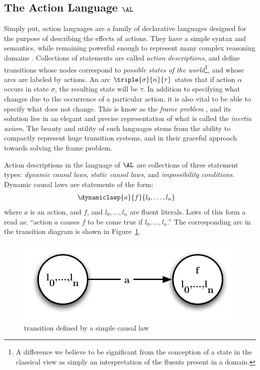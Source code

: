 \subsection{The Action Language $\AL$}

Simply put, action languages are a family of declarative languages designed for the purpose of describing the effects of actions. They have a simple syntax and semantics, while remaining powerful enough to represent many complex reasoning domains \cite{Bald2005}. Collections of statements are called \emph{action descriptions}, and define transitions whose nodes correspond to \emph{possible states of the world}\footnote{A difference we believe to be significant from the conception of a state in the classical view as simply an interpretation of the fluents present in a domain.}, and whose arcs are labeled by actions. An arc $\triple{\sigma}{\alpha}{\tau}$ states that if action $\alpha$ occurs in state $\sigma$, the resulting state will be $\tau$. In addition to specifying what changes due to the occurrence of a particular action, it is also vital to be able to specify what does not change. This is know as the \emph{frame problem} \cite{Shan97}, and its solution lies in an elegant and precise representation of what is called the \emph{inertia axiom}. The beauty and utility of such languages stems from the ability to compactly represent huge transition systems, and in their graceful approach towards solving the frame problem.

Action descriptions in the language of $\AL$ are collections of three statement types: \emph{dynamic causal laws}, \emph{static causal laws}, and \emph{impossibility conditions}. Dynamic causal laws are statements of the form:
\begin{align*}
    &\dynamiclawp{a}{f}{l_{0},\ldots,l_{n}}
\end{align*}
where $a$ is an action, and $f$, and $l_{0},\ldots,l_{n}$ are fluent literals. Laws of this form a read as: ``action $a$ causes $f$ to be come true if $l_{0},\ldots,l_{n}$.'' The corresponding arc in the transition diagram is shown in Figure~\ref{fig-dcl}.
\begin{figure}
    \centering
    \includegraphics[scale=0.5]{dynamic-law}
    \caption{transition defined by a simple causal law}
    \label{fig-dcl}
\end{figure}

